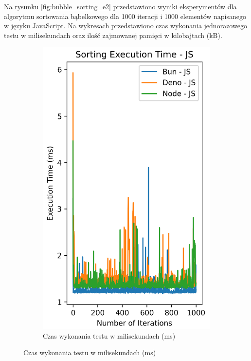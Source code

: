 Na rysunku \ref{fig:bubble_sorting_e2} przedstawiono wyniki eksperymentów dla algorytmu sortowania bąbelkowego dla 1000 iteracji i 1000 elementów napisanego w języku JavaScript. Na wykresach przedstawiono czas wykonania jednorazowego testu w milisekundach oraz ilość zajmowanej pamięci w kilobajtach (kB).

\begin{figure}[H]
  \centering
  \begin{subfigure}[b]{0.44\textwidth}
    \centering
    \includegraphics[width=\textwidth]{Figures/sorting/sorting_bubble_1000_1000_js_time.png}
    \caption{Czas wykonania testu w milisekundach (ms)}

\end{subfigure}
\end{figure}
